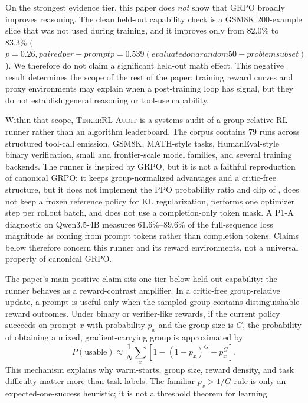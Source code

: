 \documentclass[12pt,a4paper]{report}
\newcommand{\ours}{\textsc{TinkerRL Audit}}
\begin{document}
On the strongest evidence tier, this paper does \emph{not} show that GRPO
broadly improves reasoning.  The clean held-out capability check is a GSM8K
200-example slice that was not used during training, and it improves only from
$82.0\%$ to $83.3\%$ ($p=0.26, paired per-prompt p=0.539 (evaluated on a random 50-problem subset)$).  We therefore do not claim a significant
held-out math effect.  This negative result determines the scope of the rest of
the paper: training reward curves and proxy environments may explain when a
post-training loop has signal, but they do not establish general reasoning or
tool-use capability.

Within that scope, \ours{} is a systems audit of a group-relative RL runner
rather than an algorithm leaderboard.  The corpus contains 79 runs across
structured tool-call emission, GSM8K, MATH-style tasks, HumanEval-style binary
verification, small and frontier-scale model families, and several training
backends.  The runner is inspired by GRPO, but it is not a faithful reproduction
of canonical GRPO: it keeps group-normalized advantages and a critic-free
structure, but it does not implement the PPO probability ratio and clip of
\citet{schulman2017proximal}, does not keep a frozen reference policy for KL
regularization, performs one optimizer step per rollout batch, and does not use
a completion-only token mask.  A P1-A diagnostic on Qwen3.5-4B measures
$61.6\%$--$89.6\%$ of the full-sequence loss magnitude as coming from prompt
tokens rather than completion tokens.  Claims below therefore concern this
runner and its reward environments, not a universal property of canonical GRPO.

The paper's main positive claim sits one tier below held-out capability: the
runner behaves as a reward-contrast amplifier.  In a critic-free group-relative
update, a prompt is useful only when the sampled group contains distinguishable
reward outcomes.  Under binary or verifier-like rewards, if the current policy
succeeds on prompt $x$ with probability $p_x$ and the group size is $G$, the
probability of obtaining a mixed, gradient-carrying group is approximated by
\[
P(\text{usable}) \approx \frac{1}{N}\sum_x \left[1 - (1-p_x)^G - p_x^G\right].
\]
This mechanism explains why warm-starts, group size, reward density, and task
difficulty matter more than task labels.  The familiar $p_x > 1/G$ rule is only
an expected-one-success heuristic; it is not a threshold theorem for learning.
\end{document}
